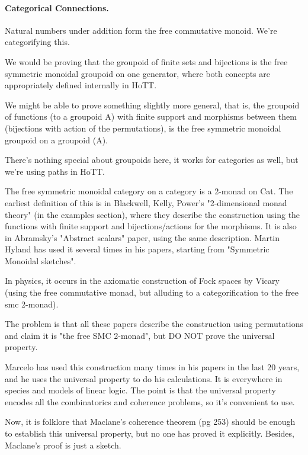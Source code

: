 \newpage

\paragraph*{Categorical Connections.}

Natural numbers under addition form the free commutative monoid. We're
categorifying this.

We would be proving that the groupoid of finite sets and bijections is
the free symmetric monoidal groupoid on one generator, where both
concepts are appropriately defined internally in HoTT.

We might be able to prove something slightly more general, that is, the
groupoid of functions (to a groupoid A) with finite support and
morphisms between them (bijections with action of the permutations), is
the free symmetric monoidal groupoid on a groupoid (A).

There's nothing special about groupoids here, it works for categories as
well, but we're using paths in HoTT.

The free symmetric monoidal category on a category is a 2-monad on
Cat. The earliest definition of this is in Blackwell, Kelly, Power's
"2-dimensional monad theory" (in the examples section), where they
describe the construction using the functions with finite support and
bijections/actions for the morphisms. It is also in Abramsky's "Abstract
scalars" paper, using the same description. Martin Hyland has used it
several times in his papers, starting from "Symmetric Monoidal
sketches".

In physics, it occurs in the axiomatic construction of Fock spaces by
Vicary (using the free commutative monad, but alluding to a
categorification to the free smc 2-monad).

The problem is that all these papers describe the construction using
permutations and claim it is "the free SMC 2-monad", but DO NOT prove
the universal property.

Marcelo has used this construction many times in his papers in the last
20 years, and he uses the universal property to do his calculations. It
is everywhere in species and models of linear logic. The point is that
the universal property encodes all the combinatorics and coherence
problems, so it's convenient to use.

Now, it is folklore that Maclane's coherence theorem (pg 253) should be
enough to establish this universal property, but no one has proved it
explicitly. Besides, Maclane's proof is just a sketch.

